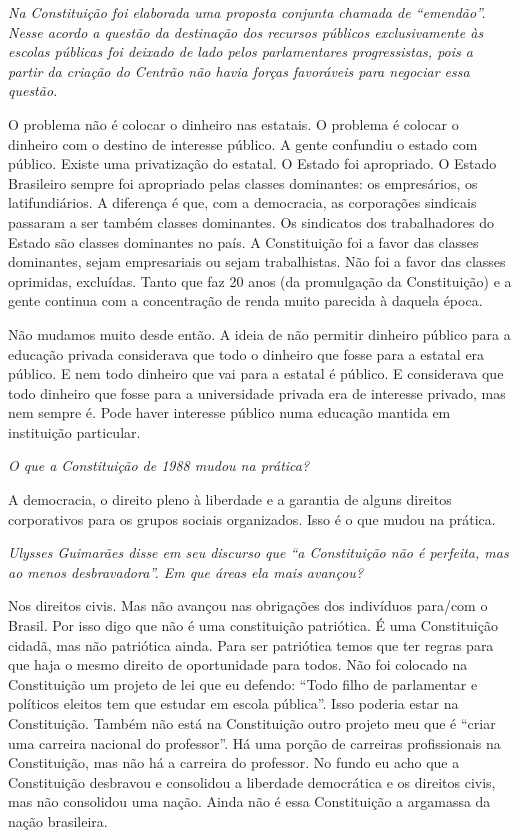\medskip

\noindent\emph{Na Constituição foi elaborada uma proposta conjunta chamada de
``emendão''. Nesse acordo a questão da destinação dos recursos públicos
exclusivamente às escolas públicas foi deixado de lado pelos
parlamentares progressistas, pois a partir da criação do Centrão não
havia forças favoráveis para negociar essa questão.}

O problema não é colocar o dinheiro nas estatais. O
problema é colocar o dinheiro com o destino de interesse público. A
gente confundiu o estado com público. Existe uma privatização do
estatal. O Estado foi apropriado. O Estado Brasileiro sempre foi
apropriado pelas classes dominantes: os empresários, os latifundiários.
A diferença é que, com a democracia, as corporações sindicais passaram a
ser também classes dominantes. Os sindicatos dos trabalhadores do Estado
são classes dominantes no país. A Constituição foi a favor das classes
dominantes, sejam empresariais ou sejam trabalhistas. Não foi a favor
das classes oprimidas, excluídas. Tanto que faz 20 anos (da promulgação
da Constituição) e a gente continua com a concentração de renda muito
parecida à daquela época.

Não mudamos muito desde então. A ideia de não permitir dinheiro público
para a educação privada considerava que todo o dinheiro que fosse para a
estatal era público. E nem todo dinheiro que vai para a estatal é
público. E considerava que todo dinheiro que fosse para a universidade
privada era de interesse privado, mas nem sempre é. Pode haver interesse
público numa educação mantida em instituição particular.

\medskip

\noindent\emph{O que a Constituição de 1988 mudou na prática?}

A democracia, o direito pleno à liberdade e a garantia
de alguns direitos corporativos para os grupos sociais organizados. Isso
é o que mudou na prática.

\medskip

\noindent\emph{Ulysses Guimarães disse em seu discurso que ``a Constituição não
é perfeita, mas ao menos desbravadora''. Em que áreas ela mais avançou?}

Nos direitos civis. Mas não avançou nas obrigações dos
indivíduos para/com o Brasil. Por isso digo que não é uma constituição
patriótica. É uma Constituição cidadã, mas não patriótica ainda. Para
ser patriótica temos que ter regras para que haja o mesmo direito de
oportunidade para todos. Não foi colocado na Constituição um projeto de
lei que eu defendo: ``Todo filho de parlamentar e políticos eleitos tem
que estudar em escola pública''. Isso poderia estar na Constituição.
Também não está na Constituição outro projeto meu que é ``criar uma
carreira nacional do professor''. Há uma porção de carreiras
profissionais na Constituição, mas não há a carreira do professor. No
fundo eu acho que a Constituição desbravou e consolidou a liberdade
democrática e os direitos civis, mas não consolidou uma nação. Ainda não
é essa Constituição a argamassa da nação brasileira.

